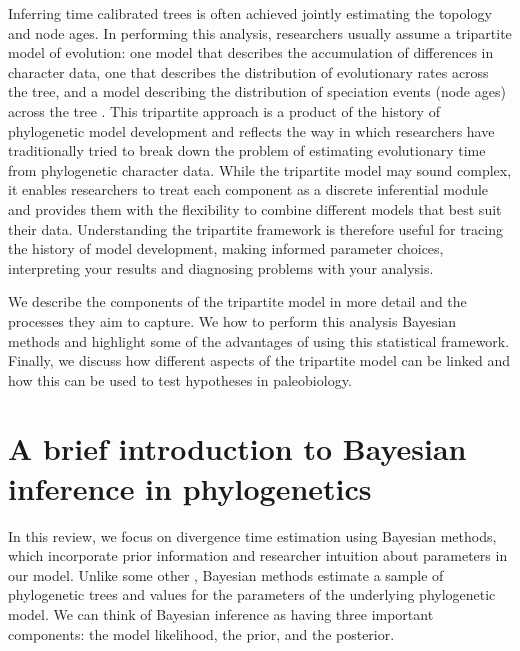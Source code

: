 Inferring time calibrated trees is often achieved  jointly estimating the topology and node ages.
In performing this analysis, researchers usually assume a tripartite model of evolution: one model that describes the accumulation of differences in character data, one that describes the distribution of evolutionary rates across the tree, and a  model describing the distribution of speciation events (node ages) across the tree \citep{Thorne1998,Kishino2001,Yang2006,Drummond2006}.
This tripartite approach is a product of the history of phylogenetic model development and reflects the way in which researchers have traditionally tried to break down the problem of estimating evolutionary time from phylogenetic character data.
While the tripartite model may sound complex, it enables researchers to treat each component as a discrete inferential module and provides them with the flexibility to combine different models that best suit their data.
Understanding the tripartite framework is therefore useful for tracing the history of model development, making informed parameter choices, interpreting your results and diagnosing problems with your analysis.

We describe the components of the tripartite model in more detail and the processes they aim to capture.
We  how to perform this analysis  Bayesian methods and highlight some of the advantages of using this statistical framework.
Finally, we discuss how different aspects of the tripartite model can be linked and how this can be used to test hypotheses in paleobiology.


\section{A brief introduction to Bayesian inference in phylogenetics}

In this review, we focus on divergence time estimation using Bayesian methods, which incorporate prior information and researcher intuition about parameters in our model.
Unlike some other , Bayesian methods estimate a sample of phylogenetic trees and  values for the parameters of the underlying phylogenetic model.
We can think of Bayesian inference as having three important components: the model likelihood, the prior, and the posterior.

